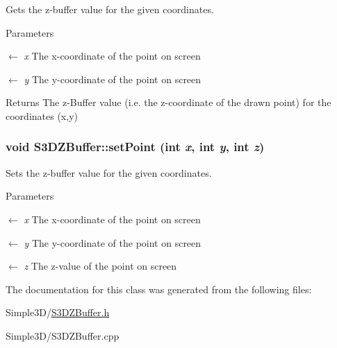 Gets the z-\/buffer value for the given coordinates. 


\begin{DoxyParams}{Parameters}
\item[\mbox{$\leftarrow$} {\em x}]The x-\/coordinate of the point on screen \item[\mbox{$\leftarrow$} {\em y}]The y-\/coordinate of the point on screen \end{DoxyParams}
\begin{DoxyReturn}{Returns}
The z-\/Buffer value (i.e. the z-\/coordinate of the drawn point) for the coordinates (x,y) 
\end{DoxyReturn}
\hypertarget{class_s3_d_z_buffer_aa712e633bf2ccf4c43bb27178a1692c1}{
\subsubsection[{setPoint}]{\setlength{\rightskip}{0pt plus 5cm}void S3DZBuffer::setPoint (int {\em x}, \/  int {\em y}, \/  int {\em z})}}
\label{class_s3_d_z_buffer_aa712e633bf2ccf4c43bb27178a1692c1}


Sets the z-\/buffer value for the given coordinates. 


\begin{DoxyParams}{Parameters}
\item[\mbox{$\leftarrow$} {\em x}]The x-\/coordinate of the point on screen \item[\mbox{$\leftarrow$} {\em y}]The y-\/coordinate of the point on screen \item[\mbox{$\leftarrow$} {\em z}]The z-\/value of the point on screen \end{DoxyParams}


The documentation for this class was generated from the following files:\begin{DoxyCompactItemize}
\item 
Simple3D/\hyperlink{_s3_d_z_buffer_8h}{S3DZBuffer.h}\item 
Simple3D/S3DZBuffer.cpp\end{DoxyCompactItemize}
